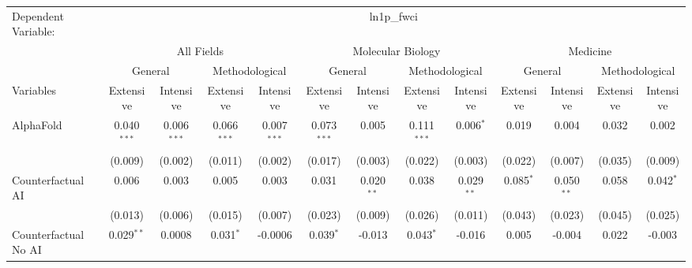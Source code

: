 \begingroup
\centering
\begin{tabular}{lcccccccccccc}
   \tabularnewline \midrule \midrule
   Dependent Variable: & \multicolumn{12}{c}{ln1p\_fwci}\\
 & \multicolumn{4}{c}{All Fields} & \multicolumn{4}{c}{Molecular Biology} & \multicolumn{4}{c}{Medicine} \\
\cmidrule(lr){2-5} \cmidrule(lr){6-9} \cmidrule(lr){10-13}
 & \multicolumn{2}{c}{General} & \multicolumn{2}{c}{Methodological} & \multicolumn{2}{c}{General} & \multicolumn{2}{c}{Methodological} & \multicolumn{2}{c}{General} & \multicolumn{2}{c}{Methodological} \\
\cmidrule(lr){2-3} \cmidrule(lr){4-5} \cmidrule(lr){6-7} \cmidrule(lr){8-9} \cmidrule(lr){10-11} \cmidrule(lr){12-13}
Variables & \multicolumn{1}{c}{Extensive} & \multicolumn{1}{c}{Intensive} & \multicolumn{1}{c}{Extensive} & \multicolumn{1}{c}{Intensive} & \multicolumn{1}{c}{Extensive} & \multicolumn{1}{c}{Intensive} & \multicolumn{1}{c}{Extensive} & \multicolumn{1}{c}{Intensive} & \multicolumn{1}{c}{Extensive} & \multicolumn{1}{c}{Intensive} & \multicolumn{1}{c}{Extensive} & \multicolumn{1}{c}{Intensive} \\
\cmidrule(lr){1-1}\cmidrule(lr){2-2} \cmidrule(lr){3-3} \cmidrule(lr){4-4} \cmidrule(lr){5-5} \cmidrule(lr){6-6} \cmidrule(lr){7-7} \cmidrule(lr){8-8} \cmidrule(lr){9-9} \cmidrule(lr){10-10} \cmidrule(lr){11-11} \cmidrule(lr){12-12} \cmidrule(lr){13-13}
   AlphaFold                                & 0.040$^{***}$ & 0.006$^{***}$  & 0.066$^{***}$ & 0.007$^{***}$ & 0.073$^{***}$ & 0.005        & 0.111$^{***}$ & 0.006$^{*}$  & 0.019       & 0.004         & 0.032   & 0.002\\   
                                            & (0.009)       & (0.002)        & (0.011)       & (0.002)       & (0.017)       & (0.003)      & (0.022)       & (0.003)      & (0.022)     & (0.007)       & (0.035) & (0.009)\\   
   Counterfactual AI                        & 0.006         & 0.003          & 0.005         & 0.003         & 0.031         & 0.020$^{**}$ & 0.038         & 0.029$^{**}$ & 0.085$^{*}$ & 0.050$^{**}$  & 0.058   & 0.042$^{*}$\\   
                                            & (0.013)       & (0.006)        & (0.015)       & (0.007)       & (0.023)       & (0.009)      & (0.026)       & (0.011)      & (0.043)     & (0.023)       & (0.045) & (0.025)\\   
   Counterfactual No AI                     & 0.029$^{**}$  & 0.0008         & 0.031$^{*}$   & -0.0006       & 0.039$^{*}$   & -0.013       & 0.043$^{*}$   & -0.016       & 0.005       & -0.004        & 0.022   & -0.003\\   

\end{tabular}
